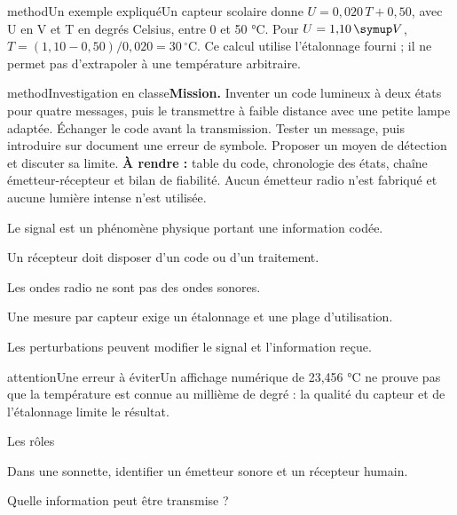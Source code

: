 \begin{pcEncadre}{method}{Un exemple expliqué}Un capteur scolaire donne $U=0{,}020\,T+0{,}50$, avec U en V et T en degrés Celsius, entre 0 et 50 °C. Pour $U=1{,}10\unite V$, $T=(1{,}10-0{,}50)/0{,}020=30\,^{\circ}\mathrm C$. Ce calcul utilise l’étalonnage fourni ; il ne permet pas d’extrapoler à une température arbitraire.\end{pcEncadre}
\label{activite-20}
\begin{pcEncadre}{method}{Investigation en classe}\textbf{Mission.} Inventer un code lumineux à deux états pour quatre messages, puis le transmettre à faible distance avec une petite lampe adaptée. Échanger le code avant la transmission. Tester un message, puis introduire sur document une erreur de symbole. Proposer un moyen de détection et discuter sa limite. \textbf{À rendre :} table du code, chronologie des états, chaîne émetteur-récepteur et bilan de fiabilité. Aucun émetteur radio n’est fabriqué et aucune lumière intense n’est utilisée.\end{pcEncadre}
\begin{questions}
\item Le signal est un phénomène physique portant une information codée.
\item Un récepteur doit disposer d’un code ou d’un traitement.
\item Les ondes radio ne sont pas des ondes sonores.
\item Une mesure par capteur exige un étalonnage et une plage d’utilisation.
\item Les perturbations peuvent modifier le signal et l’information reçue.
\end{questions}
\begin{pcEncadre}{attention}{Une erreur à éviter}Un affichage numérique de 23,456 °C ne prouve pas que la température est connue au millième de degré : la qualité du capteur et de l’étalonnage limite le résultat.\end{pcEncadre}
\pcGrille
\clearpage{}
\par\noindent\begin{minipage}{\linewidth}
\begin{exercice}[1]{Les rôles}
\begin{questions}
\item Dans une sonnette, identifier un émetteur sonore et un récepteur humain.
\item Quelle information peut être transmise ?
\end{questions}
\end{exercice}
\end{minipage}
